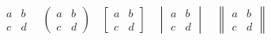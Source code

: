 \documentclass[16pt, a4paper]{article} %
\begin{document}
    \begin{equation*}
     \begin{matrix} 
        a & b \\
        c & d 
        \end{matrix}
        \quad
        \begin{pmatrix} 
        a & b \\
        c & d 
        \end{pmatrix}
        \quad
        \begin{bmatrix} 
        a & b \\
        c & d 
        \end{bmatrix}
        \quad
        \begin{vmatrix} 
        a & b \\
        c & d 
        \end{vmatrix}
        \quad
        \begin{Vmatrix} 
        a & b \\
        c & d 
        \end{Vmatrix}
    \end{equation*}
\end{document}
